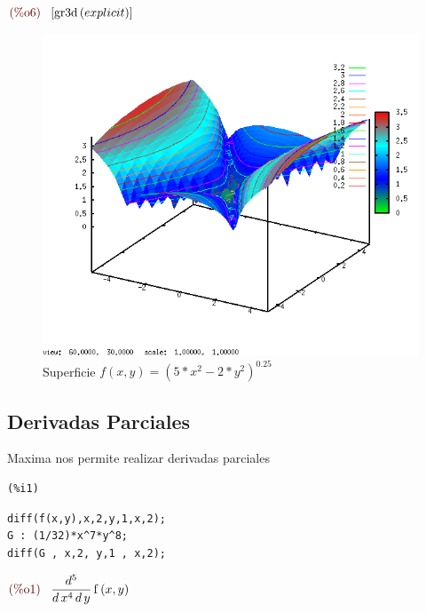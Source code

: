 \documentclass[12pt]{article}
\begin{document}
\begin{math}\displaystyle
\parbox{8ex}{\color{labelcolor}(\%o6) }
[\mathrm{gr3d}\left( explicit\right) ]
\end{math}
\begin{figure}[H]
\centering
\includegraphics[scale=0.5]{6.png}
\caption{Superficie $f(x,y)= (5*x^2-2*y^2)^0.25$ }
\end{figure}


\subsection{Derivadas Parciales}
Maxima nos permite realizar derivadas parciales 
\noindent

\begin{minipage}[t]{8ex}{\color{red}\bf
\begin{verbatim}
(%i1) 
\end{verbatim}}
\end{minipage}
\begin{minipage}[t]{\textwidth}{\color{blue}
\begin{verbatim}
diff(f(x,y),x,2,y,1,x,2);
G : (1/32)*x^7*y^8;
diff(G , x,2, y,1 , x,2);
\end{verbatim}}
\end{minipage}

\begin{math}\displaystyle
\parbox{8ex}{\color{labelcolor}(\%o1) }
\frac{{d}^{5}}{d\,{x}^{4}\,d\,y}\,\mathrm{f}\left( x,y\right) 
\end{math}
\end{document}
